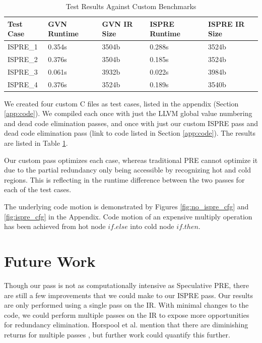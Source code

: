 \documentclass[sigplan,screen]{acmart}
\begin{document}
	\begin{table}[]
	\begin{tabular}{|l|l|l|l|l|}
	\hline
	Test Case & GVN Runtime & GVN IR Size & ISPRE Runtime & ISPRE IR Size \\ \hline \hline
	ISPRE\_1  & 0.354s & 3504b & 0.288s & 3524b \\ \hline
	ISPRE\_2  & 0.376s & 3504b & 0.185s & 3524b \\ \hline
	ISPRE\_3  & 0.061s & 3932b & 0.022s & 3984b \\ \hline
	ISPRE\_4  & 0.376s & 3524b & 0.189s & 3540b \\ \hline
	\end{tabular}
	\caption{Test Results Against Custom Benchmarks}
	\label{tab:results}
	\end{table}

    We created four custom C files as test cases, listed in the appendix (Section \ref{app:code}). We compiled each once with just the LLVM global value numbering and dead code elimination passes, and once with just our custom ISPRE pass and dead code elimination pass (link to code listed in Section \ref{app:code}). The results are listed in Table \ref{tab:results}.

    Our custom pass optimizes each case, whereas traditional PRE cannot optimize it due to the partial redundancy only being accessible by recognizing hot and cold regions. This is reflecting in the runtime difference between the two passes for each of the test cases.

    The underlying code motion is demonstrated by Figures \ref{fig:no_ispre_cfg} and \ref{fig:ispre_cfg} in the Appendix. Code motion of an expensive multiply operation has been achieved from hot node $if.else$ into cold node $if.then$.

  \section{Future Work}
	\label{sec:futureWork}
 Though our pass is not as computationally intensive as Speculative PRE, there are still a few improvements that we could make to our ISPRE pass. Our results are only performed using a single pass on the IR. With minimal changes to the code, we could perform multiple passes on the IR to expose more opportunities for redundancy elimination. Horspool et al. mention that there are diminishing returns for multiple passes \cite{ispre_paper}, but further work could quantify this further. 
\end{document}
